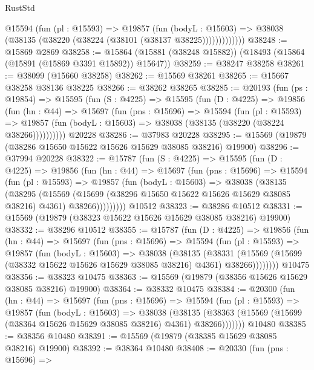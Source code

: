 \begin{lexlean}{RustStd}
\begin{coremodule}
              @15594
                (fun (pl : @15593) =>
                @19857
                  (fun (bodyL : @15603) =>
                  @38038 (@38135 (@38220 (@38224 (@38101 (@38137 @38225)))))))))))))
@38248 := @15869 @2869
@38258 := @15864 (@15881 (@38248 @15882)) (@18493 (@15864 (@15891 (@15869 @3391 @15892)) @15647))
@38259 := @38247 @38258
@38261 := @38099 (@15660 @38258)
@38262 := @15569 @38261
@38265 := @15667 @38258 @38136 @38225
@38266 := @38262 @38265
@38285 := @20193
    (fun (ps : @19854) =>
    @15595
      (fun (S : @4225) =>
      @15595
        (fun (D : @4225) =>
        @19856
          (fun (hn : @44) =>
          @15697
            (fun (pns : @15696) =>
            @15594
              (fun (pl : @15593) =>
              @19857 (fun (bodyL : @15603) => @38038 (@38135 (@38220 (@38224 @38266))))))))))
    @20228
@38286 := @37983 @20228
@38295 := @15569 (@19879 (@38286 @15650 @15622 @15626 @15629 @38085 @38216) @19900)
@38296 := @37994 @20228
@38322 := @15787
    (fun (S : @4225) =>
    @15595
      (fun (D : @4225) =>
      @19856
        (fun (hn : @44) =>
        @15697
          (fun (pns : @15696) =>
          @15594
            (fun (pl : @15593) =>
            @19857
              (fun (bodyL : @15603) =>
              @38038
                (@38135
                  (@38295
                    (@15569
                      (@15699 (@38296 @15650 @15622 @15626 @15629 @38085 @38216) @4361)
                      @38266)))))))))
    @10512
@38323 := @38286 @10512
@38331 := @15569 (@19879 (@38323 @15622 @15626 @15629 @38085 @38216) @19900)
@38332 := @38296 @10512
@38355 := @15787
    (fun (D : @4225) =>
    @19856
      (fun (hn : @44) =>
      @15697
        (fun (pns : @15696) =>
        @15594
          (fun (pl : @15593) =>
          @19857
            (fun (bodyL : @15603) =>
            @38038
              (@38135
                (@38331
                  (@15569 (@15699 (@38332 @15622 @15626 @15629 @38085 @38216) @4361) @38266))))))))
    @10475
@38356 := @38323 @10475
@38363 := @15569 (@19879 (@38356 @15626 @15629 @38085 @38216) @19900)
@38364 := @38332 @10475
@38384 := @20300
    (fun (hn : @44) =>
    @15697
      (fun (pns : @15696) =>
      @15594
        (fun (pl : @15593) =>
        @19857
          (fun (bodyL : @15603) =>
          @38038
            (@38135
              (@38363 (@15569 (@15699 (@38364 @15626 @15629 @38085 @38216) @4361) @38266)))))))
    @10480
@38385 := @38356 @10480
@38391 := @15569 (@19879 (@38385 @15629 @38085 @38216) @19900)
@38392 := @38364 @10480
@38408 := @20330
    (fun (pns : @15696) =>

\end{coremodule}
\end{lexlean}
